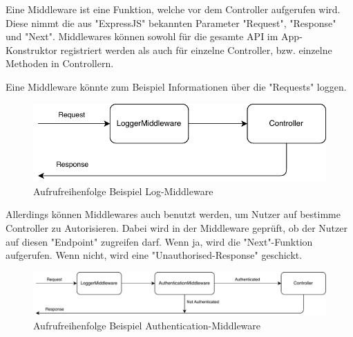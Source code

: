 \label{sec:middleware}

Eine Middleware ist eine Funktion, welche vor dem Controller aufgerufen wird. Diese nimmt die aus "ExpressJS" bekannten Parameter "Request", "Response" und "Next". Middlewares können sowohl für die gesamte API im App-Konstruktor registriert werden als auch für einzelne Controller, bzw. einzelne Methoden in Controllern.

Eine Middleware könnte zum Beispiel Informationen über die "Requests" loggen. 

\begin{figure}[H]
    \centering
    \includegraphics{media/APITemplate/LogMiddleware.svg.pdf}
    \caption{Aufrufreihenfolge Beispiel Log-Middleware} 
\end{figure}

Allerdings können Middlewares auch benutzt werden, um Nutzer auf bestimme Controller zu Autorisieren. Dabei wird in der Middleware geprüft, ob der Nutzer auf diesen "Endpoint" zugreifen darf. Wenn ja, wird die "Next"-Funktion aufgerufen. Wenn nicht, wird eine "Unauthorised-Response" geschickt.

\begin{figure}[H]
    \centering
    \includegraphics[width=15cm]{media/APITemplate/AuthMiddleware.svg.pdf}
    \caption{Aufrufreihenfolge Beispiel Authentication-Middleware} 
\end{figure}